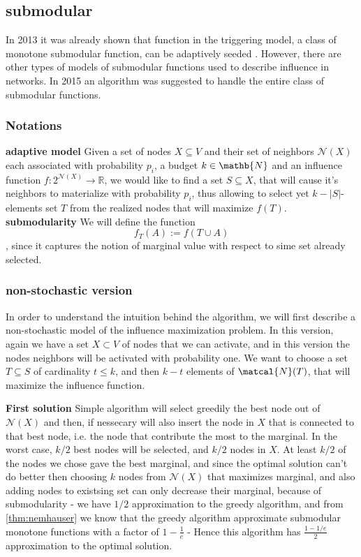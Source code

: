 \subsection{submodular}\label{sec:sub}
In 2013 it was already shown that function in the triggering model, a class of monotone submodular function, can be adaptively seeded \cite{seeman2013adaptive}. However, there are other types of models of submodular functions used to describe influence in networks. In 2015 \cite{badanidiyuru2016locally} an algorithm was suggested to handle the entire class of submodular functions.

\subsubsection{Notations}
\textbf{adaptive model} Given a set of nodes $X\subseteq V$ and their set of neighbors $\mathcal{N}(X)$ each associated with probability $p_i$, a budget $k\in\mathb{N}$ and an influence function $f:2^{\mathcal{N}(X)}\rightarrow \mathbb{R}$, we would like to find a set $S\subseteq X$, that will cause it's neighbors to materialize with probability $p_i$, thus allowing to select yet $k-|S|$-elements set $T$ from the realized nodes that will maximize $f(T)$.
\textbf{submodularity}
We will define the function $$f_T(A):=f(T\cup A)$$, since it captures the notion of marginal value with respect to sime set already selected.
 
\subsubsection{non-stochastic version}
In order to understand the intuition behind the algorithm, we will first describe a non-stochastic model of the influence maximization problem. In this version, again we have a set $X\subset V$ of nodes that we can activate, and in this version the nodes neighbors will be activated with probability one. We want to choose a set $T\subseteq S$ of cardinality $t\le k$, and then $k-t$ elements of $\matcal{N}(T)$, that will maximize the influence function. 

\textbf{First solution}
Simple algorithm will select greedily the best node out of $\mathcal{N}(X)$ and then, if nessecary will also insert the node in $X$ that is connected to that best node, i.e. the node that contribute the most to the marginal. In the worst case, $k/2$ best nodes will be selected, and $k/2$ nodes in $X$. 
At least $k/2$ of the nodes we chose gave the best marginal, and since the optimal solution can't do better then choosing $k$ nodes from $\mathcal{N}(X)$ that maximizes marginal, and also adding nodes to existsing set can only decrease their marginal, because of submodularity - we have $1/2$ approximation to the greedy algorithm, and from \ref{thm:nemhauser} we know that the greedy algorithm approximate submodular monotone functions with a factor of $1-\frac{1}{e}$ - Hence this algorithm has $\frac{1-1/e}{2}$ approximation to the optimal solution.

